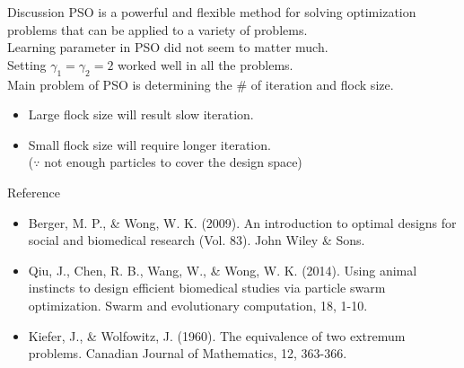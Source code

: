 \documentclass{beamer}
\begin{document}
\begin{frame}{Discussion}
  PSO is a powerful and flexible method for solving optimization problems that can be applied to a variety of problems.\\
  \vspace{3mm}
  Learning parameter in PSO did not seem to matter much.\\
  Setting $\gamma_1=\gamma_2=2$ worked well in all the problems.\\
  \vspace{3mm}
  Main problem of PSO is determining the \# of iteration and flock size.\\
  \begin{itemize}
    \item Large flock size will result slow iteration.
    \item Small flock size will require longer iteration.\\
    ($\because$ not enough particles to cover the design space)
  \end{itemize}
\end{frame}

\begin{frame}{Reference}
  \begin{itemize}
    \item Berger, M. P., \& Wong, W. K. (2009). An introduction to optimal designs for social and biomedical research (Vol. 83). John Wiley \& Sons.
    \item Qiu, J., Chen, R. B., Wang, W., \& Wong, W. K. (2014). Using animal instincts to design efficient biomedical studies via particle swarm optimization. Swarm and evolutionary computation, 18, 1-10.
    \item Kiefer, J., \& Wolfowitz, J. (1960). The equivalence of two extremum problems. Canadian Journal of Mathematics, 12, 363-366.
  \end{itemize}
\end{frame}




\end{document}
